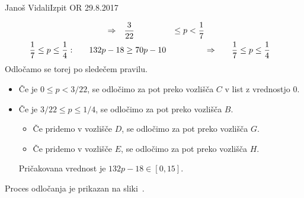 \begin{naloga}{Janoš Vidali}{Izpit OR 29.8.2017}
\begin{odgovor}
\begin{alignat*}{4}
&\quad&\Rightarrow\quad & {3 \over 22} &\le p < {1 \over 7} \\
{1 \over 7} &\le p \le {1 \over 4}: &\quad 132p - 18 &\ge 70p - 10
&\quad&\Rightarrow\quad & {1 \over 7} &\le p \le {1 \over 4}
\end{alignat*}
Odločamo se torej po sledečem pravilu.
\begin{itemize}
\item Če je $0 \le p < 3/22$,
se odločimo za pot preko vozlišča $C$ v list z vrednostjo $0$.
\item Če je $3/22 \le p \le 1/4$,
se odločimo za pot preko vozlišča $B$.
    \begin{itemize}
    \item Če pridemo v vozlišče $D$, se odločimo za pot preko vozlišča $G$.
    \item Če pridemo v vozlišče $E$, se odločimo za pot preko vozlišča $H$.
    \end{itemize}
Pričakovana vrednost je $132p - 18 \in [0, 15]$.
\end{itemize}
Proces odločanja je prikazan na sliki~.

\begin{slika}
\end{slika}
\end{odgovor}
\end{naloga}
